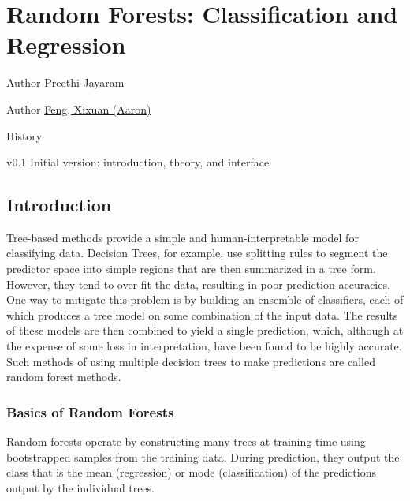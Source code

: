 
\chapter[Random Forests]{Random Forests: Classification and Regression}
\begin{moduleinfo}
\item[Author] \href{mailto:pjayaram@pivotal.io}{Preethi Jayaram}
\item[Author] \href{mailto:xfeng@pivotal.io}{Feng, Xixuan (Aaron)}
\item[History]
    \begin{modulehistory}
            \item[v0.1] Initial version: introduction, theory, and interface
    \end{modulehistory}
\end{moduleinfo}

\section{Introduction} %
\label{sec:introduction}

Tree-based methods provide a simple and human-interpretable model for classifying data.
Decision Trees, for example, use splitting rules to segment the predictor space into simple
regions that are then summarized in a tree form. However, they tend to over-fit the data, 
resulting in poor prediction accuracies. One way to mitigate this problem is by building an
ensemble of classifiers, each of which produces a tree model on some combination of the 
input data. The results of these models are then combined to yield a single prediction, 
which, although at the expense of some loss in interpretation, have been found to be
highly accurate. Such methods of using multiple decision trees to make predictions 
are called random forest methods.

\subsection{Basics of Random Forests} %
\label{sub:basics_of_random_forests}
Random forests operate by constructing many trees at training time using bootstrapped
samples from the training data. During prediction, they output the class that is the
mean (regression) or mode (classification) of the predictions output by the individual trees.

